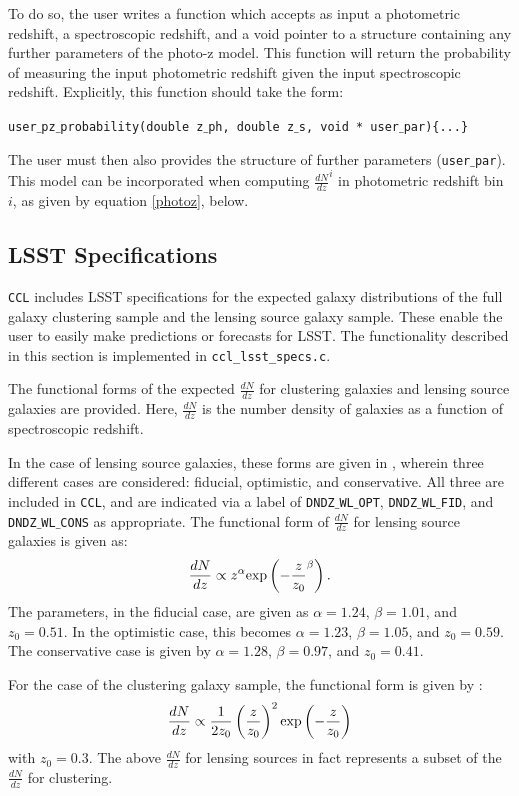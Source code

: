 \documentclass[\docopts]{\docclass}
\begin{document}
To do so, the user writes a function which accepts as input a photometric redshift, a spectroscopic redshift, and a void pointer to a structure containing any further parameters of the photo-z model. This function will return the probability of measuring the input photometric redshift given the input spectroscopic redshift. Explicitly, this function should take the form:

{\tt user$\_$pz$\_$probability(double z$\_$ph, double z$\_$s, void * user$\_$par)\{...\}}

The user must then also provides the structure of further parameters ({\tt user$\_$par}). This model can be incorporated when computing $\frac{dN}{dz}^i$ in photometric redshift bin $i$, as given by equation \ref{photoz}, below.

\subsection{LSST Specifications}
\label{sec:specs}

{\tt CCL} includes LSST specifications for the expected galaxy distributions of the full galaxy clustering sample and the lensing source galaxy sample. These enable the user to easily make predictions or forecasts for LSST. The functionality described in this section is implemented in {\tt ccl\_lsst\_specs.c}.

The functional forms of the expected $\frac{dN}{dz}$ for clustering galaxies and lensing source galaxies are provided. Here, $\frac{dN}{dz}$ is the number density of galaxies as a function of spectroscopic redshift.

In the case of lensing source galaxies, these forms are given in \cite{Chang2013}, wherein three different cases are considered: fiducial, optimistic, and conservative. All three are included in {\tt CCL}, and are indicated via a label of {\tt DNDZ$\_$WL$\_$OPT}, {\tt DNDZ$\_$WL$\_$FID}, and {\tt DNDZ$\_$WL$\_$CONS} as appropriate. The functional form of $\frac{dN}{dz}$ for lensing source galaxies is given as:
\begin{equation}
\frac{dN}{dz} \propto z^\alpha {\rm exp}\left(-\frac{z}{z_0}^\beta\right).
\label{dndz_src}
\end{equation}
The parameters, in the fiducial case, are given as $\alpha=1.24$, $\beta=1.01$, and $z_0=0.51$. In the optimistic case, this becomes $\alpha=1.23$, $\beta=1.05$, and $z_0=0.59$. The conservative case is given by $\alpha=1.28$, $\beta=0.97$, and $z_0=0.41$.

For the case of the clustering galaxy sample, the functional form is given by \cite{ScienceBook}:
\begin{equation}
\frac{dN}{dz} \propto \frac{1}{2z_0}\left(\frac{z}{z_0}\right)^2 {\rm exp}\left(-\frac{z}{z_0}\right)
\label{dndz_clust}
\end{equation}
with $z_0=0.3$. The above $\frac{dN}{dz}$ for lensing sources in fact represents a subset of the $\frac{dN}{dz}$ for clustering.
\end{document}
